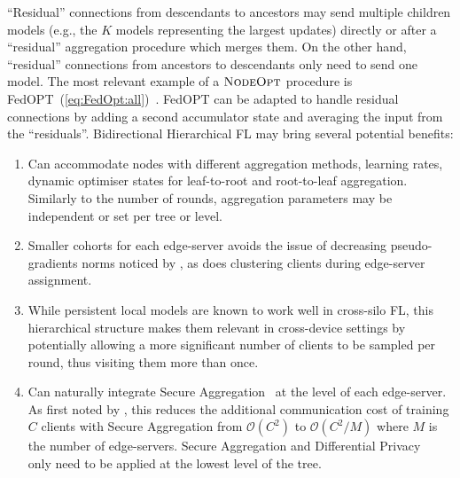 ``Residual'' connections from descendants to ancestors may send multiple children models (e.g., the $K$ models representing the largest updates) directly or after a ``residual'' aggregation procedure which merges them. On the other hand, ``residual'' connections from ancestors to descendants only need to send one model. The most relevant example of a $\textsc{NodeOpt}$ procedure is FedOPT~(\cref{eq:FedOpt:all})~\citep{FedOPT}. FedOPT can be adapted to handle residual connections by adding a second accumulator state and averaging the input from the ``residuals''.
Bidirectional Hierarchical FL  may bring several potential benefits:
\begin{enumerate}
    \item Can accommodate nodes with different aggregation methods, learning rates, dynamic optimiser states for leaf-to-root and root-to-leaf aggregation. Similarly to the number of rounds, aggregation parameters may be independent or set per tree or level.
    \item Smaller cohorts for each edge-server avoids the issue of decreasing pseudo-gradients norms noticed by \citet{LargeCohorts}, as does clustering clients during edge-server assignment.
    \item While persistent local models are known to work well in cross-silo FL, this hierarchical structure makes them relevant in cross-device settings by potentially allowing a more significant number of clients to be sampled per round, thus visiting them more than once.
    \item Can naturally integrate Secure Aggregation~\citep{SecAggOG,FastSecAgg} at the level of each edge-server. As first noted by \citet{ScaleSystemDesign}, this reduces the additional communication cost of training $C$ clients with Secure Aggregation from $\mathcal{O}(C^2)$ to $\mathcal{O}(C^2/M)$ where $M$ is the number of edge-servers. Secure Aggregation and Differential Privacy~\citep{DiffPrivacyFL} only need to be applied at the lowest level of the tree.

\end{enumerate}

